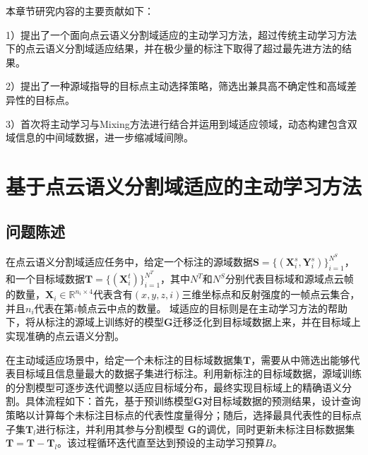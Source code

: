 




本章节研究内容的主要贡献如下：

1）提出了一个面向点云语义分割域适应的主动学习方法，超过传统主动学习方法下的点云语义分割域适应结果，并在极少量的标注下取得了超过最先进方法的结果。

2）提出了一种源域指导的目标点主动选择策略，筛选出兼具高不确定性和高域差异性的目标点。

3）首次将主动学习与Mixing方法进行结合并运用到域适应领域，动态构建包含双域信息的中间域数据，进一步缩减域间隙。


\section{基于点云语义分割域适应的主动学习方法}
\subsection{问题陈述}
在点云语义分割域适应任务中，给定一个标注的源域数据\(\mathbf{S} = \{(\mathbf{X}_i^s, \mathbf{Y}_i^s)\}_{i=1}^{N^S}\)，和一个目标域数据$\mathbf{T} = \{(\mathbf{X}_i^t)\}_{i=1}^ {N^T}$，其中\(N^T\)和\(N^S\)分别代表目标域和源域点云帧的数量，$\mathbf{X}_i \in \mathbb{R}^{{n_i} \times 4}$代表含有$(x,y,z,i)$三维坐标点和反射强度的一帧点云集合，并且$n_i$代表在第$i$帧点云中点的数量。 域适应的目标则是在主动学习方法的帮助下，将从标注的源域上训练好的模型$\mathbf{G}$迁移泛化到目标域数据上来，并在目标域上实现准确的点云语义分割。

在主动域适应场景中，给定一个未标注的目标域数据集$\mathbf{T}$，需要从中筛选出能够代表目标域且信息量最大的数据子集进行标注。利用新标注的目标域数据，源域训练的分割模型可逐步迭代调整以适应目标域分布，最终实现目标域上的精确语义分割。具体流程如下：首先，基于预训练模型$\mathbf{G}$对目标域数据的预测结果，设计查询策略以计算每个未标注目标点的代表性度量得分；随后，选择最具代表性的目标点子集\(\mathbf{T}_l\)进行标注，并利用其参与分割模型 $\mathbf{G}$的调优，同时更新未标注目标数据集\(\mathbf{T}=\mathbf{T}-\mathbf{T}_l\)。该过程循环迭代直至达到预设的主动学习预算$B$。 
